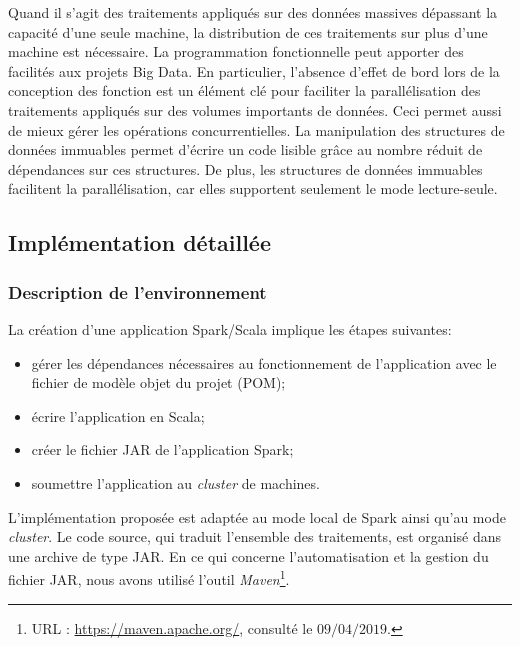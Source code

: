Quand il s'agit des traitements appliqués sur des données massives dépassant la capacité d'une seule machine, la distribution de ces traitements sur plus d'une machine  est nécessaire. La programmation fonctionnelle peut apporter des facilités aux projets Big Data. 
En particulier, l'absence d'effet de bord lors de la conception des fonction est un élément clé pour faciliter la parallélisation des traitements appliqués sur des volumes importants de données. Ceci permet aussi de mieux gérer les opérations concurrentielles. 
La manipulation des structures de données immuables permet d'écrire un code lisible grâce au nombre réduit de dépendances sur ces structures. De plus, les structures de données immuables facilitent la parallélisation, car elles supportent seulement le mode lecture-seule.




\subsection{Implémentation détaillée }
\subsubsection{Description de l'environnement}
La création d'une application Spark/Scala implique  les étapes suivantes:
\begin{itemize}
	\item gérer les dépendances nécessaires au fonctionnement de l'application avec le fichier de modèle objet du projet (POM);
	\item écrire l'application en Scala;
	\item créer le fichier JAR de l'application Spark;
	 \item soumettre  l'application  au \textit{cluster} de machines. 
\end{itemize}

L'implémentation proposée est adaptée au mode local de Spark  ainsi qu'au  mode \textit{cluster}. 
Le code source, qui traduit l'ensemble des traitements, est organisé dans une archive de type JAR.
En ce qui concerne  l'automatisation et la gestion du fichier JAR, nous avons utilisé l'outil \textit{Maven}\footnote{URL : \url{https://maven.apache.org/}, consulté le $09/04/2019$.}.


